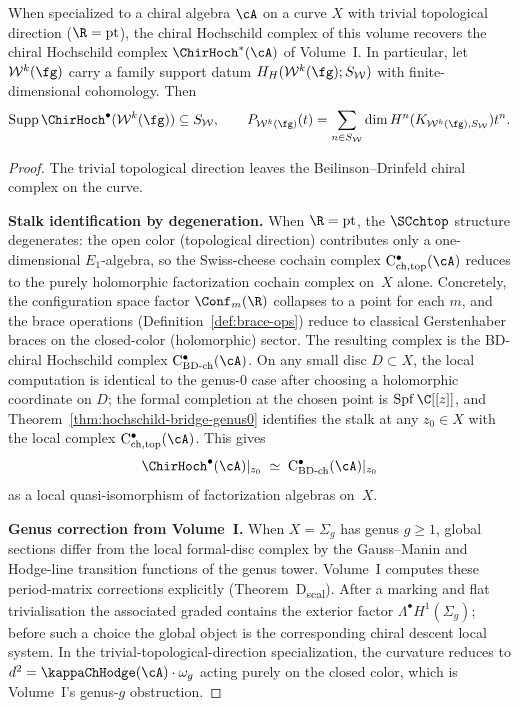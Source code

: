 \begin{corollary}
\label{cor:hochschild-bridge}
When specialized to a chiral algebra $\cA$ on a curve $X$ with
trivial topological direction ($\R = \mathrm{pt}$), the chiral
Hochschild complex of this volume recovers the chiral Hochschild
complex $\ChirHoch^*(\cA)$ of Volume~I\@.  In particular, let
$\mathcal W^k(\fg)$ carry a family support datum
$H_H(\mathcal W^k(\fg);S_{\mathcal W})$ with finite-dimensional
cohomology.  Then
\[
 \operatorname{Supp}\ChirHoch^\bullet(\mathcal W^k(\fg))
 \subseteq S_{\mathcal W},
 \qquad
 P_{\mathcal W^k(\fg)}(t)
 =\sum_{n\in S_{\mathcal W}}
 \dim H^n(K_{\mathcal W^k(\fg),S_{\mathcal W}})t^n.
\]
\end{corollary}

\begin{proof}
The trivial topological direction leaves the Beilinson--Drinfeld
chiral complex on the curve.

\medskip
\noindent\textbf{Stalk identification by degeneration.}
When $\R = \mathrm{pt}$, the $\SCchtop$ structure degenerates: the
open color (topological direction) contributes only a one-dimensional
$E_1$-algebra, so the Swiss-cheese cochain complex
$\mathrm{C}^\bullet_{\mathrm{ch,top}}(\cA)$ reduces to the purely
holomorphic factorization cochain complex on~$X$ alone. Concretely,
the configuration space factor $\Conf_m(\R)$ collapses to a point for
each $m$, and the brace operations (Definition~\ref{def:brace-ops})
reduce to classical Gerstenhaber braces on the closed-color
(holomorphic) sector. The resulting complex is the BD-chiral
Hochschild complex $\mathrm{C}^\bullet_{\mathrm{BD\text{-}ch}}(\cA)$.
On any small disc $D \subset X$, the local computation is identical
to the genus-$0$ case after choosing a holomorphic coordinate on \(D\);
the formal completion at the chosen point is
\(\operatorname{Spf}\C[[z]]\), and
Theorem~\ref{thm:hochschild-bridge-genus0} identifies the
stalk at any $z_0 \in X$ with the local complex
$\mathrm{C}^\bullet_{\mathrm{ch,top}}(\cA)$. This gives
\[
 \ChirHoch^\bullet(\cA)|_{z_0}
 \;\simeq\;
 \mathrm{C}^\bullet_{\mathrm{BD\text{-}ch}}(\cA)|_{z_0}
\]
as a local quasi-isomorphism of factorization algebras on~$X$.

\medskip
\noindent\textbf{Genus correction from Volume~I.}
When $X = \Sigma_g$ has genus $g \geq 1$, global sections differ
from the local formal-disc complex by the Gauss--Manin and Hodge-line
transition functions of the genus tower. Volume~I computes these
period-matrix corrections explicitly
(Theorem~D\textsubscript{scal}). After a marking and flat
trivialisation the associated graded contains the exterior factor
\(\Lambda^\bullet H^1(\Sigma_g)\); before such a choice the global
object is the corresponding chiral descent local system. In the
trivial-topological-direction specialization, the curvature
reduces to $d^2 = \kappaChHodge(\cA) \cdot \omega_g$ acting purely
on the closed color, which is Volume~I's genus-$g$ obstruction.


\end{proof}
